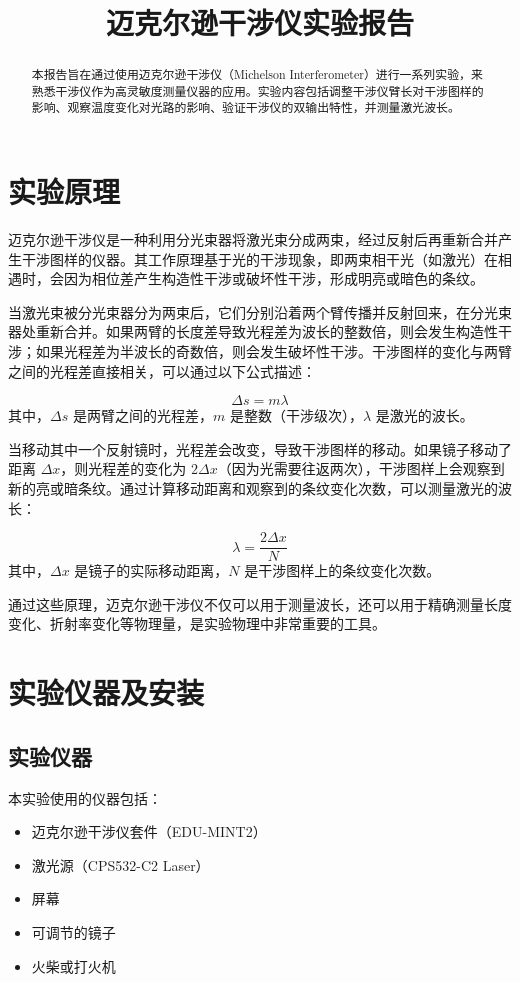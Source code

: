 \documentclass{ctexart}
\title{迈克尔逊干涉仪实验报告}
\begin{document}
\maketitle

\begin{abstract}
本报告旨在通过使用迈克尔逊干涉仪（Michelson Interferometer）进行一系列实验，来熟悉干涉仪作为高灵敏度测量仪器的应用。实验内容包括调整干涉仪臂长对干涉图样的影响、观察温度变化对光路的影响、验证干涉仪的双输出特性，并测量激光波长。
\end{abstract}

\section{实验原理}
迈克尔逊干涉仪是一种利用分光束器将激光束分成两束，经过反射后再重新合并产生干涉图样的仪器。其工作原理基于光的干涉现象，即两束相干光（如激光）在相遇时，会因为相位差产生构造性干涉或破坏性干涉，形成明亮或暗色的条纹。

当激光束被分光束器分为两束后，它们分别沿着两个臂传播并反射回来，在分光束器处重新合并。如果两臂的长度差导致光程差为波长的整数倍，则会发生构造性干涉；如果光程差为半波长的奇数倍，则会发生破坏性干涉。干涉图样的变化与两臂之间的光程差直接相关，可以通过以下公式描述：

\[ \Delta s = m \lambda \]
其中，\(\Delta s\) 是两臂之间的光程差，\(m\) 是整数（干涉级次），\(\lambda\) 是激光的波长。

当移动其中一个反射镜时，光程差会改变，导致干涉图样的移动。如果镜子移动了距离 \(\Delta x\)，则光程差的变化为 \(2\Delta x\)（因为光需要往返两次），干涉图样上会观察到新的亮或暗条纹。通过计算移动距离和观察到的条纹变化次数，可以测量激光的波长：

\[ \lambda = \frac{2 \Delta x}{N} \]
其中，\(\Delta x\) 是镜子的实际移动距离，\(N\) 是干涉图样上的条纹变化次数。


通过这些原理，迈克尔逊干涉仪不仅可以用于测量波长，还可以用于精确测量长度变化、折射率变化等物理量，是实验物理中非常重要的工具。
\section{实验仪器及安装}
\subsection{实验仪器}
本实验使用的仪器包括：
\begin{itemize}
    \item 迈克尔逊干涉仪套件（EDU-MINT2）
    \item 激光源（CPS532-C2 Laser）
    \item 屏幕
    \item 可调节的镜子
    \item 火柴或打火机
\end{itemize}
\end{document}
